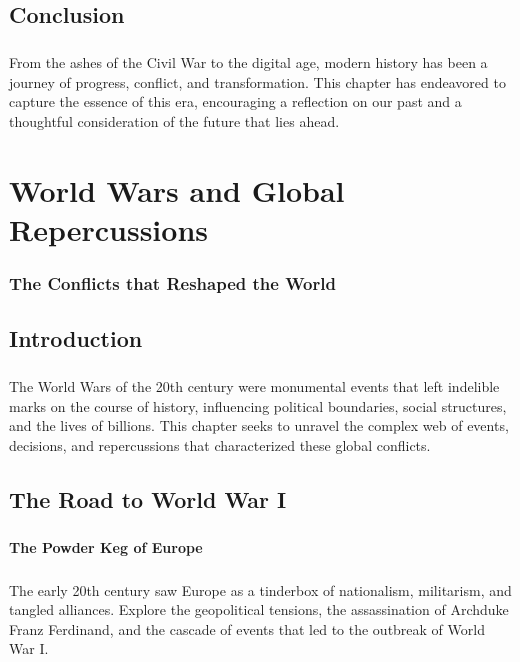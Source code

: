 \documentclass[a4paper,12pt]{book}
\begin{document}
\section*{Conclusion}
\paragraph{}
From the ashes of the Civil War to the digital age, modern history has been a journey of progress, conflict, and transformation. This chapter has endeavored to capture the essence of this era, encouraging a reflection on our past and a thoughtful consideration of the future that lies ahead.

\chapter{World Wars and Global Repercussions}
\subsection*{The Conflicts that Reshaped the World}

\section*{Introduction}
\paragraph{}
The World Wars of the 20th century were monumental events that left indelible marks on the course of history, influencing political boundaries, social structures, and the lives of billions. This chapter seeks to unravel the complex web of events, decisions, and repercussions that characterized these global conflicts.

\section*{The Road to World War I}
\paragraph{}
\subsubsection*{The Powder Keg of Europe}
\paragraph{}
The early 20th century saw Europe as a tinderbox of nationalism, militarism, and tangled alliances. Explore the geopolitical tensions, the assassination of Archduke Franz Ferdinand, and the cascade of events that led to the outbreak of World War I.
\end{document}
